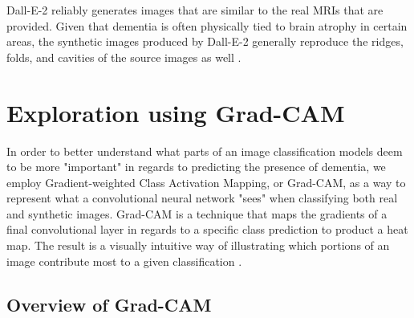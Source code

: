 \documentclass [MAS] {uclathes}
\begin{document}
Dall-E-2 reliably generates images that are similar to the real MRIs that are provided. Given that dementia is often 
physically tied to brain atrophy in certain areas, the synthetic images produced by Dall-E-2 generally reproduce the 
ridges, folds, and cavities of the source images as well \cite{brain_atrophy}.

\chapter{Exploration using Grad-CAM}

In order to better understand what parts of an image classification models deem to be more "important" in regards to 
predicting the presence of dementia, we employ Gradient-weighted Class Activation Mapping, or Grad-CAM, as a way to 
represent what a convolutional neural network "sees" when classifying both real and synthetic images. Grad-CAM is a 
technique that maps the gradients of a final convolutional layer in regards to a specific class prediction to product a 
heat map. The result is a visually intuitive way of illustrating which portions of an image contribute most to a given 
classification \cite{gradcam}.

\section{Overview of Grad-CAM}
\end{document}
